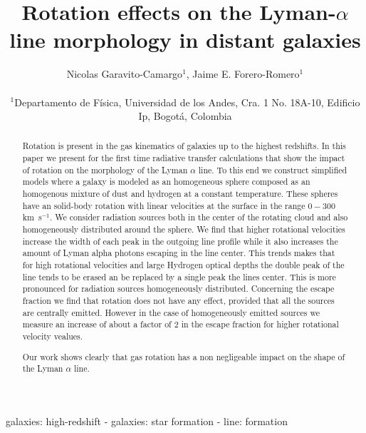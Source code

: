 \documentclass[usenatbib]{mn2e}
\newcommand{\kms}{\,km~s$^{-1}$}
\begin{document}
\title[Rotation in the Lyman-$\alpha$ line]{Rotation effects on the
  Lyman-$\alpha$ line morphology in distant galaxies}
\author[N. Garavito and J.E. Forero-Romero]{
\parbox[t]{\textwidth}{\raggedright 
  Nicolas Garavito-Camargo$^{1}$,
  Jaime E. Forero-Romero$^{1}$ 
}
\vspace*{6pt}\\
$^{1}$Departamento de F\'{i}sica, Universidad de los Andes, Cra. 1
No. 18A-10, Edificio Ip, Bogot\'a, Colombia 
}
\maketitle

\begin{abstract}
Rotation is present in the gas kinematics of galaxies up to the
highest redshifts. In this paper we present for the first time
radiative transfer calculations that show the impact of rotation on
the morphology of the Lyman $\alpha$ line. To this end we construct
simplified models where a galaxy is modeled as an homogeneous sphere
composed as an homogenous mixture of dust and hydrogen at a constant
temperature. These spheres have an solid-body rotation with linear
velocities at the surface in the range $0-300$ \kms. We consider
radiation sources both in the center of the rotating cloud and also
homogeneously distributed around the sphere. We find that higher
rotational velocities increase the width of each peak in the outgoing
line profile while it also increases the amount of Lyman alpha photons
escaping in the line center. This trends makes that for high
rotational velocities and large Hydrogen optical depths the double
peak of the line tends to be erased an be replaced by a single peak the
lines center. This is more pronounced for radiation sources
homogeneously distributed. Concerning the escape fraction we find that
rotation does not have any effect, provided that all the sources are
centrally emitted. However in the case of homogeneously emitted
sources we measure an increase of about a factor of $2$ in the escape
fraction for higher rotational velocity vealues.


Our work shows clearly that gas rotation has a non
negligeable impact on the shape of the Lyman $\alpha$ line.

\end{abstract}
\begin{keywords}
galaxies: high-redshift - galaxies: star formation - line: formation
\end{keywords}
\end{document}
